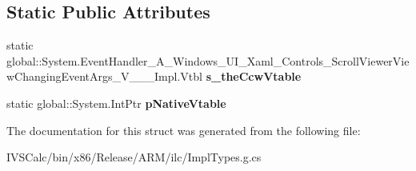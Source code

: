 \subsection*{Static Public Attributes}
\begin{DoxyCompactItemize}
\item 
\mbox{\label{struct_system_1_1_event_handler___a___windows___u_i___xaml___controls___scroll_viewer_view_chang628699d11d7aafe20e51b1c40740a5dc_a407d759b947336096e734608a92cfc67}} 
static global\+::\+System.\+Event\+Handler\+\_\+\+A\+\_\+\+Windows\+\_\+\+U\+I\+\_\+\+Xaml\+\_\+\+Controls\+\_\+\+Scroll\+Viewer\+View\+Changing\+Event\+Args\+\_\+\+V\+\_\+\+\_\+\+\_\+\+Impl.\+Vtbl {\bfseries s\+\_\+the\+Ccw\+Vtable}
\item 
\mbox{\label{struct_system_1_1_event_handler___a___windows___u_i___xaml___controls___scroll_viewer_view_chang628699d11d7aafe20e51b1c40740a5dc_af1419f78b879bf4ce8974a1c7f5c993b}} 
static global\+::\+System.\+Int\+Ptr {\bfseries p\+Native\+Vtable}
\end{DoxyCompactItemize}


The documentation for this struct was generated from the following file\+:\begin{DoxyCompactItemize}
\item 
I\+V\+S\+Calc/bin/x86/\+Release/\+A\+R\+M/ilc/Impl\+Types.\+g.\+cs\end{DoxyCompactItemize}
